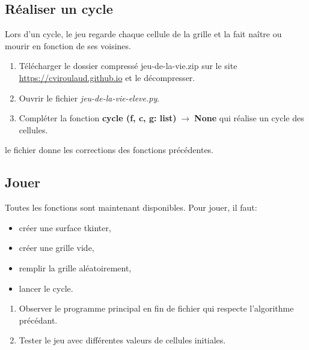\documentclass[a4paper,11pt]{article}
\begin{document}
\begin{Form}
\subsection{Réaliser un cycle}
Lors d'un cycle, le jeu regarde chaque cellule de la grille et la fait naître ou mourir en fonction de ses voisines.
\begin{activite}
\begin{enumerate}
\item Télécharger le dossier compressé jeu-de-la-vie.zip sur le site \url{https://cviroulaud.github.io} et le décompresser.
\item Ouvrir le fichier \emph{jeu-de-la-vie-eleve.py}.
\item Compléter la fonction \textbf{cycle (f, c, g: list)$\;\rightarrow\;$None} qui réalise un cycle des cellules.
\end{enumerate}
\begin{commentprof}
le fichier donne les corrections des fonctions précédentes.
\end{commentprof}
\end{activite}

\subsection{Jouer}
Toutes les fonctions sont maintenant disponibles. Pour jouer, il faut:
\begin{itemize}
\item créer une surface tkinter,
\item créer une grille vide,
\item remplir la grille aléatoirement,
\item lancer le cycle.
\end{itemize}
\begin{activite}
\begin{enumerate}
\item Observer le programme principal en fin de fichier qui respecte l'algorithme précédant.
\item Tester le jeu avec différentes valeurs de cellules initiales.
\end{enumerate}
\end{activite}

\end{Form}
\end{document}
